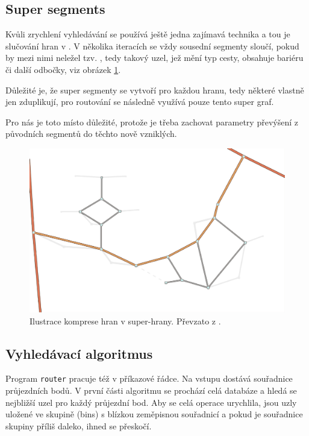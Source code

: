 \documentclass[thesis=B,czech]{FITthesis}[2012/06/26]
\begin{document}
\subsection{Super segments}
\label{super-segments}
Kvůli zrychlení vyhledávání se používá ještě jedna zajímavá technika a tou je slučování hran v . V několika iteracích se vždy sousední segmenty sloučí, pokud by mezi nimi neležel tzv. , tedy takový uzel, jež mění typ cesty, obsahuje bariéru či další odbočky, viz obrázek \ref{img:superhrany}.

Důležité je, že super segmenty se vytvoří pro každou hranu, tedy některé vlastně jen zduplikují, pro routování se následně využívá pouze tento super graf.

Pro nás je toto místo důležité, protože je třeba zachovat parametry převýšení z původních segmentů do těchto nově vzniklých.

\begin{figure}[!ht]
\centering
\includegraphics[width=\columnwidth]{obrazky/supernodes.pdf}
\caption{Ilustrace komprese hran v super-hrany. Převzato z \cite{routino-doc}. }
\label{img:superhrany}
\end{figure}



\subsection{Vyhledávací algoritmus}
\label{vyhledavaci-algoritmus}
Program \verb|router| pracuje též v příkazové řádce. Na vstupu dostává souřadnice průjezdních bodů. V první části algoritmu se prochází celá databáze a hledá se nejbližší uzel pro každý průjezdní bod. Aby se celá operace urychlila, jsou uzly uložené ve skupině (bins) s blízkou zeměpisnou souřadnicí a pokud je souřadnice skupiny příliš daleko, ihned se přeskočí.
\end{document}
